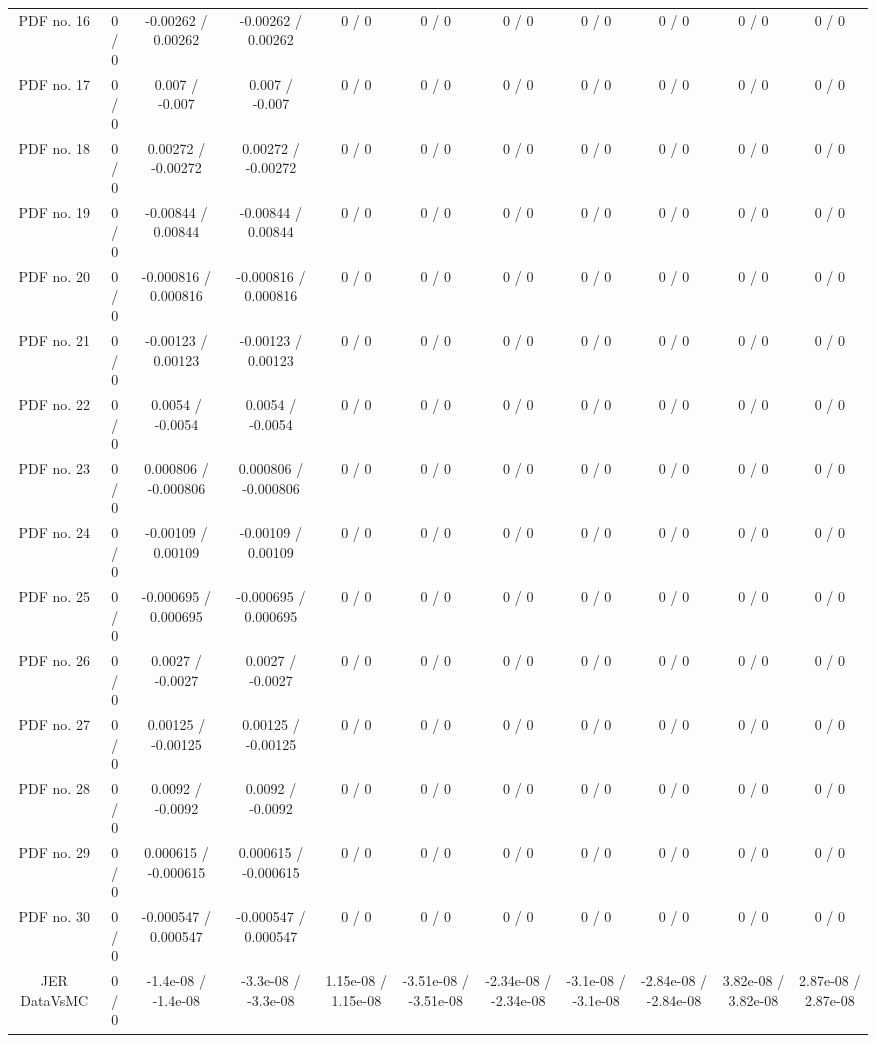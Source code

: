 \begin{table}[htbp]
\begin{center}
\begin{tabular}{|c|c|c|c|c|c|c|c|c|c|c|}
  PDF no. 16 & 0 / 0 & -0.00262 / 0.00262 & -0.00262 / 0.00262 & 0 / 0 & 0 / 0 & 0 / 0 & 0 / 0 & 0 / 0 & 0 / 0 & 0 / 0 \\ 
  PDF no. 17 & 0 / 0 & 0.007 / -0.007 & 0.007 / -0.007 & 0 / 0 & 0 / 0 & 0 / 0 & 0 / 0 & 0 / 0 & 0 / 0 & 0 / 0 \\ 
  PDF no. 18 & 0 / 0 & 0.00272 / -0.00272 & 0.00272 / -0.00272 & 0 / 0 & 0 / 0 & 0 / 0 & 0 / 0 & 0 / 0 & 0 / 0 & 0 / 0 \\ 
  PDF no. 19 & 0 / 0 & -0.00844 / 0.00844 & -0.00844 / 0.00844 & 0 / 0 & 0 / 0 & 0 / 0 & 0 / 0 & 0 / 0 & 0 / 0 & 0 / 0 \\ 
  PDF no. 20 & 0 / 0 & -0.000816 / 0.000816 & -0.000816 / 0.000816 & 0 / 0 & 0 / 0 & 0 / 0 & 0 / 0 & 0 / 0 & 0 / 0 & 0 / 0 \\ 
  PDF no. 21 & 0 / 0 & -0.00123 / 0.00123 & -0.00123 / 0.00123 & 0 / 0 & 0 / 0 & 0 / 0 & 0 / 0 & 0 / 0 & 0 / 0 & 0 / 0 \\ 
  PDF no. 22 & 0 / 0 & 0.0054 / -0.0054 & 0.0054 / -0.0054 & 0 / 0 & 0 / 0 & 0 / 0 & 0 / 0 & 0 / 0 & 0 / 0 & 0 / 0 \\ 
  PDF no. 23 & 0 / 0 & 0.000806 / -0.000806 & 0.000806 / -0.000806 & 0 / 0 & 0 / 0 & 0 / 0 & 0 / 0 & 0 / 0 & 0 / 0 & 0 / 0 \\ 
  PDF no. 24 & 0 / 0 & -0.00109 / 0.00109 & -0.00109 / 0.00109 & 0 / 0 & 0 / 0 & 0 / 0 & 0 / 0 & 0 / 0 & 0 / 0 & 0 / 0 \\ 
  PDF no. 25 & 0 / 0 & -0.000695 / 0.000695 & -0.000695 / 0.000695 & 0 / 0 & 0 / 0 & 0 / 0 & 0 / 0 & 0 / 0 & 0 / 0 & 0 / 0 \\ 
  PDF no. 26 & 0 / 0 & 0.0027 / -0.0027 & 0.0027 / -0.0027 & 0 / 0 & 0 / 0 & 0 / 0 & 0 / 0 & 0 / 0 & 0 / 0 & 0 / 0 \\ 
  PDF no. 27 & 0 / 0 & 0.00125 / -0.00125 & 0.00125 / -0.00125 & 0 / 0 & 0 / 0 & 0 / 0 & 0 / 0 & 0 / 0 & 0 / 0 & 0 / 0 \\ 
  PDF no. 28 & 0 / 0 & 0.0092 / -0.0092 & 0.0092 / -0.0092 & 0 / 0 & 0 / 0 & 0 / 0 & 0 / 0 & 0 / 0 & 0 / 0 & 0 / 0 \\ 
  PDF no. 29 & 0 / 0 & 0.000615 / -0.000615 & 0.000615 / -0.000615 & 0 / 0 & 0 / 0 & 0 / 0 & 0 / 0 & 0 / 0 & 0 / 0 & 0 / 0 \\ 
  PDF no. 30 & 0 / 0 & -0.000547 / 0.000547 & -0.000547 / 0.000547 & 0 / 0 & 0 / 0 & 0 / 0 & 0 / 0 & 0 / 0 & 0 / 0 & 0 / 0 \\ 
  JER DataVsMC & 0 / 0 & -1.4e-08 / -1.4e-08 & -3.3e-08 / -3.3e-08 & 1.15e-08 / 1.15e-08 & -3.51e-08 / -3.51e-08 & -2.34e-08 / -2.34e-08 & -3.1e-08 / -3.1e-08 & -2.84e-08 / -2.84e-08 & 3.82e-08 / 3.82e-08 & 2.87e-08 / 2.87e-08 \\ 

\end{tabular}
\end{center}
\end{table}

